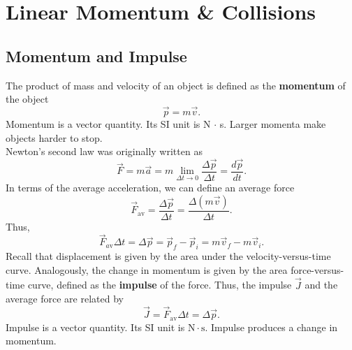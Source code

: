\documentclass[11pt,letterpaper]{report}
\begin{document}
\pagestyle{empty}
\setcounter{secnumdepth}{0}
\setcounter{chapter}{3}

\chapter{Linear Momentum \& Collisions}

\section{Momentum and Impulse}
The product of mass and velocity of an object is defined as the \textbf{momentum} of the object $$\vec{p} = m \vec{v}.$$
Momentum is a vector quantity. Its SI unit is N $\cdot$ s. Larger momenta make objects harder to stop.
\\Newton's second law was originally written as $$\vec{F} = m \vec{a} = m \lim_{\Delta{t} \to 0}{\frac{\Delta{\vec{p}}}{\Delta{t}}} = \frac{d\vec{p}}{dt}.$$ In terms of the average acceleration, we can define an average force $$\vec{F}_\mathrm{av} = \frac{\Delta{\vec{p}}}{\Delta{t}} = \frac{\Delta{\left(m \vec{v}\right)}}{\Delta{t}}.$$
Thus, $$\vec{F}_{a\mathrm{v}} \Delta{t} = \Delta{\vec{p}} = \vec{p}_f - \vec{p}_i = m \vec{v}_f - m \vec{v}_i.$$
Recall that displacement is given by the area under the velocity-versus-time curve. Analogously, the change in momentum is given by the area force-versus-time curve, defined as the \textbf{impulse} of the force. Thus, the impulse $\vec{J}$ and the average force are related by $$\vec{J} = \vec{F}_\mathrm{av} \Delta{t} = \Delta{\vec{p}}.$$
Impulse is a vector quantity. Its SI unit is $\mathrm{N} \cdot \mathrm{s}$. Impulse produces a change in momentum.
\end{document}
